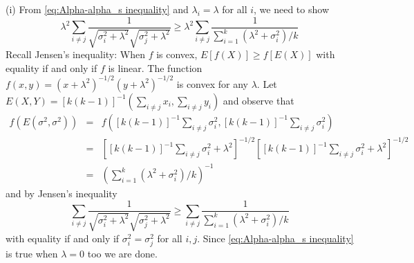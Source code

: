 \documentclass{article}
\makeatletter
\theoremstyle{plain}
\theoremstyle{plain}
\theoremstyle{definition}
\theoremstyle{remark}
\theoremstyle{definition}
\theoremstyle{plain}
\theoremstyle{plain}
\theoremstyle{definition}
\newenvironment{proof}[1][\protect\proofname]{\par
	\normalfont\topsep6\p@\@plus6\p@\relax
	\trivlist
	\itemindent\parindent
	\item[\hskip\labelsep\scshape #1]\ignorespaces
}{%
	\endtrivlist\@endpefalse
}
\providecommand{\proofname}{Proof}
\makeatother
\begin{document}
\begin{proof}[Proof of Proposition \ref{prop:Reliabilities.}]\label{proof:Reliabilities.}
(i) From \eqref{eq:Alpha-alpha_s inequality} and $\lambda_{i}=\lambda$
for all $i$, we need to show
\[
\lambda^{2}\sum_{i\neq j}\frac{1}{\sqrt{\sigma_{i}^{2}+\lambda^{2}}\sqrt{\sigma_{j}^{2}+\lambda^{2}}}\geq\lambda^{2}\sum_{i\neq j}\frac{1}{\sum_{i=1}^{k}\left(\lambda^{2}+\sigma_{i}^{2}\right)/k}
\]
Recall Jensen's inequality: When $f$ is convex, $E\left[f\left(X\right)\right]\geq f\left[E\left(X\right)\right]$ with equality if and only if $f$ is linear.
The function $f\left(x,y\right)=\left(x+\lambda^{2}\right)^{-1/2}\left(y+\lambda^{2}\right)^{-1/2}$
is convex for any $\lambda$. Let $E\left(X,Y\right)=\left[k\left(k-1\right)\right]^{-1}\left(\sum_{i\neq j}x_{i},\sum_{i\neq j}y_{i}\right)$
and observe that
\begin{eqnarray*}
f\left(E\left(\sigma^{2},\sigma^{2}\right)\right) & = & f\left(\left[k\left(k-1\right)\right]^{-1}\sum_{i\neq j}\sigma_{i}^{2},\left[k\left(k-1\right)\right]^{-1}\sum_{i\neq j}\sigma_{i}^{2}\right)\\
 & = & \left[\left[k\left(k-1\right)\right]^{-1}\sum_{i\neq j}\sigma_{i}^{2}+\lambda^{2}\right]^{-1/2}\left[\left[k\left(k-1\right)\right]^{-1}\sum_{i\neq j}\sigma_{i}^{2}+\lambda^{2}\right]^{-1/2}\\
 & = & \left(\sum_{i=1}^{k}\left(\lambda^{2}+\sigma_{i}^{2}\right)/k\right)^{-1}
\end{eqnarray*}
and by Jensen's inequality
\[
\sum_{i\neq j}\frac{1}{\sqrt{\sigma_{i}^{2}+\lambda^{2}}\sqrt{\sigma_{j}^{2}+\lambda^{2}}}\geq\sum_{i\neq j}\frac{1}{\sum_{i=1}^{k}\left(\lambda^{2}+\sigma_{i}^{2}\right)/k}
\]
with equality if and only if $\sigma_{i}^{2}=\sigma_{j}^{2}$ for
all $i,j$. Since \eqref{eq:Alpha-alpha_s inequality} is true when
$\lambda=0$ too we are done.


\end{proof}
\end{document}
